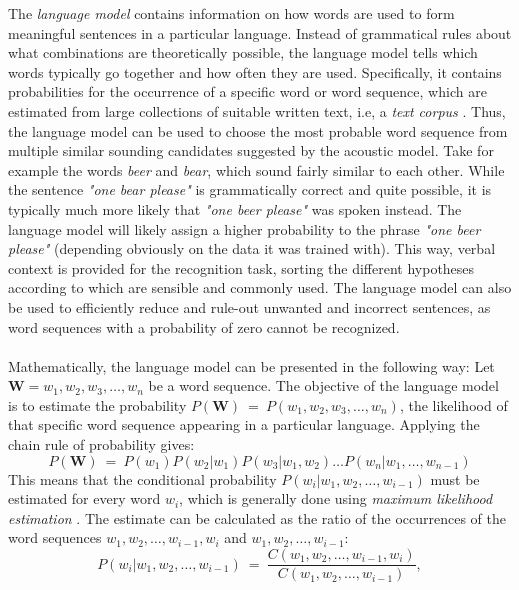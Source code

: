 \documentclass[english, 12pt, a4paper, pdftex, elec, utf8]{aaltothesis}
\begin{document}
The \textit{language model} contains information on how words are used to form meaningful sentences in a particular language. Instead of grammatical rules about what combinations are theoretically possible, the language model tells which words typically go together and how often they are used. Specifically, it contains probabilities for the occurrence of a specific word or word sequence, which are estimated from large collections of suitable written text, i.e, a \textit{text corpus} \cite{kallasjoki2016}. Thus, the language model can be used to choose the most probable word sequence from multiple similar sounding candidates suggested by the acoustic model. Take for example the words \textit{beer} and \textit{bear}, which sound fairly similar to each other. While the sentence \textit{"one bear please"} is grammatically correct and quite possible, it is typically much more likely that \textit{"one beer please"} was spoken instead. The language model will likely assign a higher probability to the phrase \textit{"one beer please"} (depending obviously on the data it was trained with). This way, verbal context is provided for the recognition task, sorting the different hypotheses according to which are sensible and commonly used. The language model can also be used to efficiently reduce and rule-out unwanted and incorrect sentences, as word sequences with a probability of zero cannot be recognized. \\\\
Mathematically, the language model can be presented in the following way: Let $\bm{W} = w_1, w_2, w_3,\dots,w_n$ be a word sequence. The objective of the language model is to estimate the probability $P(\bm{W}) \ = \ P(w_1, w_2, w_3,\dots,w_n)$, the likelihood of that specific word sequence appearing in a particular language. Applying the chain rule of probability gives:
\begin{equation}
P(\bm{W}) \ = \ P(w_1) P(w_2|w_1) P(w_3|w_1,w_2) \dots P(w_n|w_1,\dots,w_{n-1})
\end{equation}
This means that the conditional probability $P(w_i|w_1,w_2,\dots,w_{i-1})$ must be estimated for every word $w_i$, which is generally done using \textit{maximum likelihood estimation} \cite{arisoy2008statistical}. The estimate can be calculated as the ratio of the occurrences of the word sequences $w_1,w_2,\dots,w_{i-1},w_i$ and $w_1,w_2,\dots,w_{i-1}$:
\begin{equation} \label{eq:ml}
P(w_i|w_1,w_2,\dots,w_{i-1}) \ = \ \frac{C(w_1,w_2,\dots,w_{i-1},w_i)}{C(w_1,w_2,\dots,w_{i-1})},
\end{equation}
\end{document}
